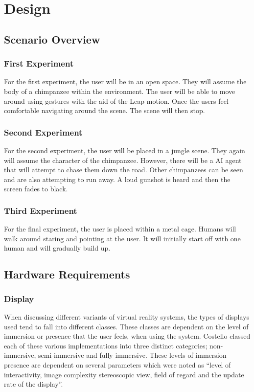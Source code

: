 \documentclass[12pt]{report}
\begin{document}
\chapter{Design}

\section{Scenario Overview}

\subsection{First Experiment}
For the first experiment, the user will be in an open space. They will assume the body of a chimpanzee within the environment. The user will be able to move around using gestures with the aid of the Leap motion. Once the users feel comfortable navigating around the scene. The scene will then stop.  

\subsection{Second Experiment}
For the second experiment, the user will be placed in a jungle scene. They again will assume the character of the chimpanzee. However, there will be a AI agent that will attempt to chase them down the road. Other chimpanzees can be seen and are also attempting to run away. A loud gunshot is heard and then the screen fades to black.

\subsection{Third Experiment}

For the final experiment, the user is placed within a metal cage. Humans will walk around staring and pointing at the user. It will initially start off with one human and will gradually build up.   


\section{Hardware Requirements}
\subsection{Display}
When discussing different variants of virtual reality systems, the types of displays used tend to fall into different classes. These classes are dependent on the level of immersion or presence that the user feels, when using the system. Costello  classed each of these various implementations into three distinct categories; non-immersive, semi-immersive and fully immersive. These levels of immersion presence are dependent on several parameters which were noted as “level of interactivity, image complexity stereoscopic view, field of regard and the update rate of the display”. 
\\
\end{document}
